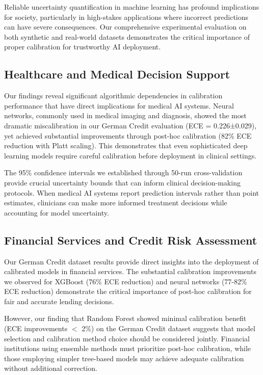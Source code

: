 \documentclass[12pt, a4paper]{article}
\begin{document}
Reliable uncertainty quantification in machine learning has profound implications for society, particularly in high-stakes applications where incorrect predictions can have severe consequences. Our comprehensive experimental evaluation on both synthetic and real-world datasets demonstrates the critical importance of proper calibration for trustworthy AI deployment.

\subsection{Healthcare and Medical Decision Support}

Our findings reveal significant algorithmic dependencies in calibration performance that have direct implications for medical AI systems. Neural networks, commonly used in medical imaging and diagnosis, showed the most dramatic miscalibration in our German Credit evaluation (ECE = 0.226±0.029), yet achieved substantial improvements through post-hoc calibration (82\% ECE reduction with Platt scaling). This demonstrates that even sophisticated deep learning models require careful calibration before deployment in clinical settings.

The 95\% confidence intervals we established through 50-run cross-validation provide crucial uncertainty bounds that can inform clinical decision-making protocols. When medical AI systems report prediction intervals rather than point estimates, clinicians can make more informed treatment decisions while accounting for model uncertainty.

\subsection{Financial Services and Credit Risk Assessment}

Our German Credit dataset results provide direct insights into the deployment of calibrated models in financial services. The substantial calibration improvements we observed for XGBoost (76\% ECE reduction) and neural networks (77-82\% ECE reduction) demonstrate the critical importance of post-hoc calibration for fair and accurate lending decisions.

However, our finding that Random Forest showed minimal calibration benefit (ECE improvements $<$ 2\%) on the German Credit dataset suggests that model selection and calibration method choice should be considered jointly. Financial institutions using ensemble methods must prioritize post-hoc calibration, while those employing simpler tree-based models may achieve adequate calibration without additional correction.
\end{document}
